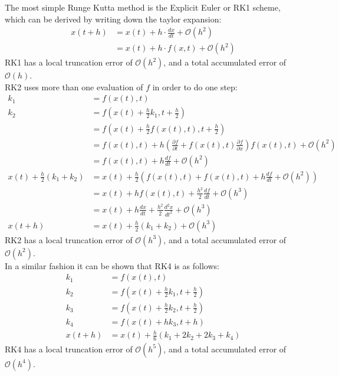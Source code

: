The most simple Runge Kutta method is the Explicit Euler or RK1 scheme, which can be derived by writing down the taylor expansion:
\begin{align*}
x(t+h) &= x(t) + h \cdot \frac{dx}{dt} + \mathcal{O}(h ^2)\\
&= x(t) + h \cdot f(x,t) + \mathcal{O}(h ^2)
\end{align*}
RK1 has a local truncation error of $\mathcal{O}(h^2)$, and a total accumulated error of $\mathcal{O}(h)$.\\
RK2 uses more than one evaluation of $f$ in order to do one step:
\begin{align*}
k_1 &= f(x(t),t)\\
k_2 &= f(x(t) + \frac{h}{2} k_1, t + \frac{h}{2})\\
&= f(x(t) + \frac{h}{2} f(x(t),t), t + \frac{h}{2})\\
&= f(x(t),t) + h(\frac{\partial f}{\partial t} + f(x(t),t)\frac{\partial f}{\partial x})f(x(t),t) + \mathcal{O}(h^2)\\
&= f(x(t),t) + h\frac{df}{dt} + \mathcal{O}(h^2)\\
x(t) + \frac{h}{2} (k_1+k_2) &= x(t) + \frac{h}{2} (f(x(t),t) + f(x(t),t) + h\frac{df}{dt} + \mathcal{O}(h^2))\\
&= x(t) + h f(x(t),t) + \frac{h^2}{2} \frac{df}{dt} + \mathcal{O}(h^3)\\
&= x(t) + h \frac{dx}{dt} + \frac{h^2}{2} \frac{d^2x}{dt^2} + \mathcal{O}(h^3)\\
x(t+h) &= x(t) + \frac{h}{2} (k_1+k_2) + \mathcal{O}(h^3)
\end{align*}
RK2 has a local truncation error of $\mathcal{O}(h^3)$, and a total accumulated error of $\mathcal{O}(h^2)$.\\
In a similar fashion it can be shown that RK4 is as follows:
\begin{align*}
k_1 &= f(x(t),t)\\
k_2 &= f(x(t)+\frac{h}{2}k_1,t+\frac{h}{2})\\
k_3 &= f(x(t)+\frac{h}{2}k_2,t+\frac{h}{2})\\
k_4 &= f(x(t) + h k_3, t + h)\\
x(t+h) &= x(t) + \frac{h}{6}(k_1+2k_2+2k_3+k_4)
\end{align*}
RK4 has a local truncation error of $\mathcal{O}(h^5)$, and a total accumulated error of $\mathcal{O}(h^4)$.\\

